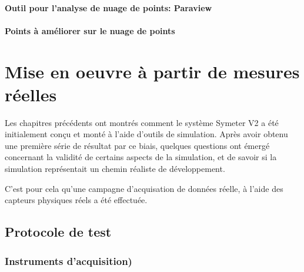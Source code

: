 \documentclass[12pt,a4paper]{report}
\begin{document}
		\subsubsection{Outil pour l'analyse de nuage de points: Paraview}
		
		\subsubsection{Points à améliorer sur le nuage de points}
		
		
		
		
\chapter{Mise en oeuvre à partir de mesures réelles}

Les chapitres précédents ont montrés comment le système Symeter V2 a été initialement conçu et monté à l'aide d'outils de simulation. Après avoir obtenu une première série de résultat par ce biais, quelques questions ont émergé concernant la validité de certains aspects de la simulation, et de savoir si la simulation représentait un chemin réaliste de développement.

\para C'est pour cela qu'une campagne d'acquisation de données réelle, à l'aide des capteurs physiques réels a été effectuée.


	\section{Protocole de test}
	\subsection{Instruments d'acquisition)}
	
\end{document}

